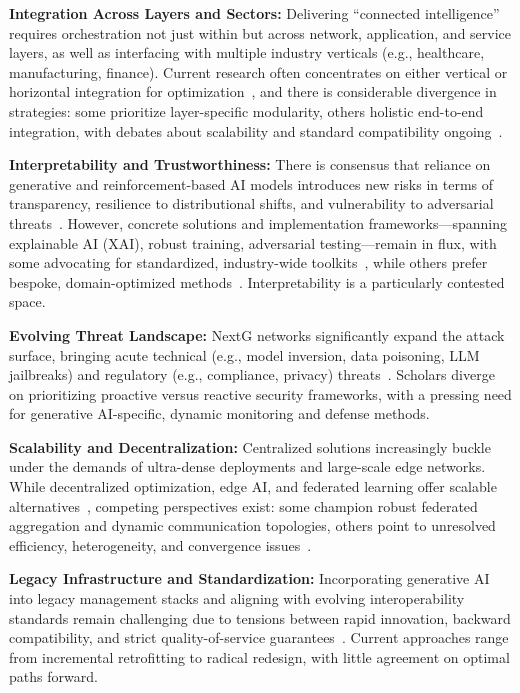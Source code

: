 \documentclass[sigconf]{acmart}
\begin{document}
\textbf{Integration Across Layers and Sectors:} Delivering ``connected intelligence'' requires orchestration not just within but across network, application, and service layers, as well as interfacing with multiple industry verticals (e.g., healthcare, manufacturing, finance). Current research often concentrates on either vertical or horizontal integration for optimization~\cite{ref4, ref5, ref24, ref46}, and there is considerable divergence in strategies: some prioritize layer-specific modularity, others holistic end-to-end integration, with debates about scalability and standard compatibility ongoing~\cite{ref29, ref49}.

\textbf{Interpretability and Trustworthiness:} There is consensus that reliance on generative and reinforcement-based AI models introduces new risks in terms of transparency, resilience to distributional shifts, and vulnerability to adversarial threats~\cite{ref3, ref7, ref18, ref26, ref38}. However, concrete solutions and implementation frameworks—spanning explainable AI (XAI), robust training, adversarial testing—remain in flux, with some advocating for standardized, industry-wide toolkits~\cite{ref7, ref33, ref38}, while others prefer bespoke, domain-optimized methods~\cite{ref18, ref38}. Interpretability is a particularly contested space.

\textbf{Evolving Threat Landscape:} NextG networks significantly expand the attack surface, bringing acute technical (e.g., model inversion, data poisoning, LLM jailbreaks) and regulatory (e.g., compliance, privacy) threats~\cite{ref3, ref15, ref33}. Scholars diverge on prioritizing proactive versus reactive security frameworks, with a pressing need for generative AI-specific, dynamic monitoring and defense methods.

\textbf{Scalability and Decentralization:} Centralized solutions increasingly buckle under the demands of ultra-dense deployments and large-scale edge networks. While decentralized optimization, edge AI, and federated learning offer scalable alternatives~\cite{ref19, ref22, ref23, ref31, ref35, ref49}, competing perspectives exist: some champion robust federated aggregation and dynamic communication topologies, others point to unresolved efficiency, heterogeneity, and convergence issues~\cite{ref23, ref35}.

\textbf{Legacy Infrastructure and Standardization:} Incorporating generative AI into legacy management stacks and aligning with evolving interoperability standards remain challenging due to tensions between rapid innovation, backward compatibility, and strict quality-of-service guarantees~\cite{ref25, ref39, ref40, ref46}. Current approaches range from incremental retrofitting to radical redesign, with little agreement on optimal paths forward.
\end{document}
